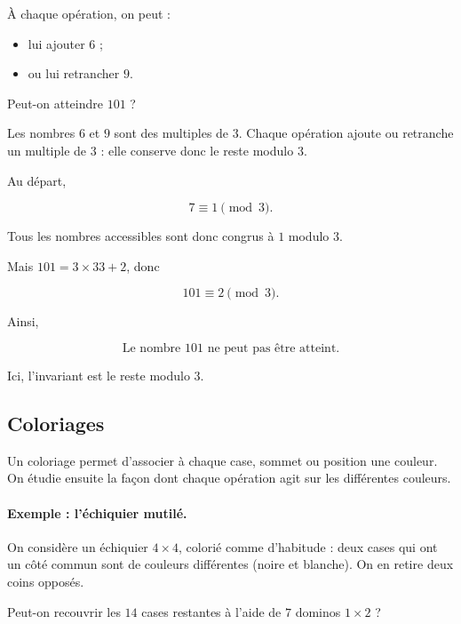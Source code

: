 À chaque opération, on peut :

\begin{itemize}
    \item lui ajouter \(6\) ;
    \item ou lui retrancher \(9\).
\end{itemize}

Peut-on atteindre \(101\) ?

Les nombres \(6\) et \(9\) sont des multiples de \(3\). Chaque opération
ajoute ou retranche un multiple de \(3\) : elle conserve donc le reste
modulo \(3\).

Au départ,

\[
7\equiv 1\pmod 3.
\]

Tous les nombres accessibles sont donc congrus à \(1\) modulo \(3\).

Mais \(101=3\times33+2\), donc

\[
101\equiv 2\pmod 3.
\]

Ainsi,

\[
\boxed{\text{Le nombre \(101\) ne peut pas être atteint.}}
\]

Ici, l'invariant est le reste modulo \(3\).

\subsection{Coloriages}

Un coloriage permet d'associer à chaque case, sommet ou position une couleur.
On étudie ensuite la façon dont chaque opération agit sur les différentes
couleurs.

\paragraph{Exemple : l'échiquier mutilé.}

On considère un échiquier \(4\times4\), colorié comme d'habitude : deux
cases qui ont un côté commun sont de couleurs différentes (noire et blanche).
On en retire deux coins opposés.

Peut-on recouvrir les \(14\) cases restantes à l'aide de \(7\) dominos
\(1\times2\) ?

\begin{center}
\end{center}

